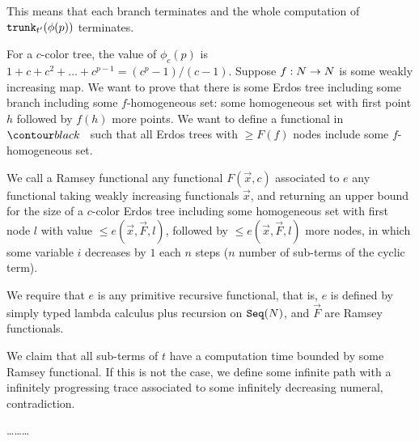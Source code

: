 This means that each branch terminates and the whole computation of ${\tt trunk}_{t'}(\phi(p))$ terminates.

For a $c$-color tree, the value of $\phi_c(p)$ is $1+c+c^2+\ldots+c^{p-1} = (c^{p}-1)/(c-1)$.
Suppose $f:{N} \rightarrow {N}$ is some weakly increasing map. We want to prove that
there is some Erdos tree including some branch including some $f$-homogeneous set: some
homogeneous set with first point $h$ followed by $f(h)$ more points. We
want to define a functional in $\systemT$ such that all Erdos trees with $\ge F(f)$ nodes
include some $f$-homogeneous set.

We call a Ramsey functional any functional $F(\vec{x},c)$ associated to $e$
any functional taking weakly increasing functionals $\vec{x}$,
and returning an upper bound for the size of a $c$-color Erdos tree including some homogeneous set
with first node $l$ with value $\le e(\vec{x},\vec{F},l)$, 
followed by $\le e(\vec{x},\vec{F},l)$ more nodes, in which some variable $i$ decreases by $1$
each $n$ steps ($n$ number of sub-terms of the cyclic term). 

We require that $e$ is any primitive recursive
functional, that is, $e$ is 
defined by simply typed lambda calculus plus recursion on ${\tt Seq}({N})$, and $\vec{F}$ are Ramsey functionals.

We claim that all sub-terms of $t$ have a computation time bounded by some Ramsey functional.
If this is not the case, we define some infinite path with a infinitely progressing trace
associated to some infinitely decreasing numeral, contradiction.



\ldots\ldots\ldots


